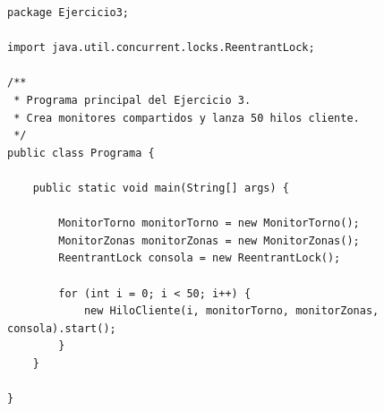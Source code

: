 \documentclass[12pt,a4paper]{article}
\begin{document}
\begin{lstlisting}[caption={Programa.java}]
package Ejercicio3;

import java.util.concurrent.locks.ReentrantLock;

/**
 * Programa principal del Ejercicio 3.
 * Crea monitores compartidos y lanza 50 hilos cliente.
 */
public class Programa {

	public static void main(String[] args) {

		MonitorTorno monitorTorno = new MonitorTorno();
		MonitorZonas monitorZonas = new MonitorZonas();
		ReentrantLock consola = new ReentrantLock();

		for (int i = 0; i < 50; i++) {
			new HiloCliente(i, monitorTorno, monitorZonas, consola).start();
		}
	}

}

\end{lstlisting}
\end{document}
